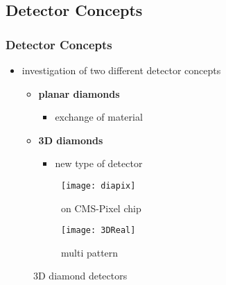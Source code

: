 \subsection{Detector Concepts}
\begin{frame}
	\frametitle{Detector Concepts}
	\begin{itemize}
		\item investigation of two different detector concepts
		\vspace*{5pt}
		\begin{itemize}
			\item \textbf{planar diamonds}
			\begin{itemize}
				\item exchange of material
			\end{itemize}
			\item \textbf{3D diamonds}
			\begin{itemize}
				\item new type of detector
			\end{itemize}
		\end{itemize}
	\end{itemize}
	
	\begin{figure}[htbp] 
		\begin{center}
			\begin{subfigure}{0.45\textwidth}  
				\centering 
				\texttt{[image: diapix]}
				\caption{on CMS-Pixel chip}
			\end{subfigure}
			\begin{subfigure}{0.45\textwidth} 
				\centering 
				\texttt{[image: 3DReal]}
				\caption{multi pattern} 	
			\end{subfigure} 
			\caption{3D diamond detectors} 
		\end{center}
	\end{figure}
\end{frame}
